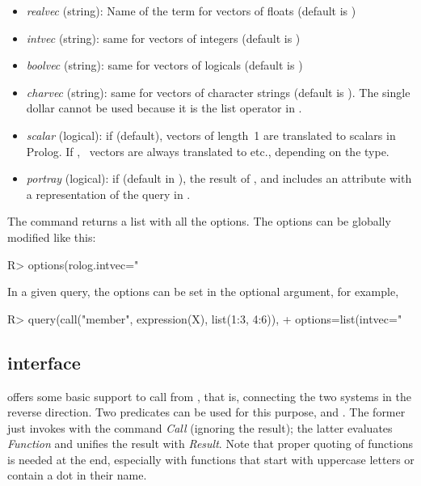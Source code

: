 \documentclass[article]{jss}
\begin{document}
\begin{itemize}
\item \emph{realvec} (string): Name of the  term for vectors of
  floats (default is \code{\#})
\item \emph{intvec} (string): same for vectors of integers (default is \code{\%})
\item \emph{boolvec} (string): same for vectors of logicals (default is \code{!})
\item \emph{charvec} (string): same for vectors of character strings (default
  is \code{\$\$}). The single dollar cannot be used because it is the list
  operator in .
\item \emph{scalar} (logical): if  (default),  vectors of
  length\ 1 are translated to scalars in Prolog. 
  If , \ vectors are always translated to 
  etc., depending on the type.
\item \emph{portray} (logical): if  (default in ), the
  result of ,  and  includes an attribute 
  with a representation of the query in .
\end{itemize}

The command  returns a list with all the options. The 
options can be globally modified like this:

\begin{Schunk}
\begin{Sinput}
R> options(rolog.intvec="%
\end{Sinput}
\end{Schunk}

In a given query, the options can be set in the optional argument, for example,

\begin{Schunk}
\begin{Sinput}
R> query(call("member", expression(X), list(1:3, 4:6)),
+        options=list(intvec="%
\end{Sinput}
\end{Schunk}

\subsection[Prolog interface]{ interface}

 offers some basic support to call  
from , that is, connecting the two systems in the reverse
direction. Two predicates can be used for this purpose, 
and . The former just invokes  with
the command \emph{Call} (ignoring the result); the latter 
evaluates \emph{Function} and unifies the result with \emph{Result}. Note that
proper quoting of  functions is needed at the  end,
especially with  functions that start with uppercase letters or
contain a dot in their name.
\end{document}
